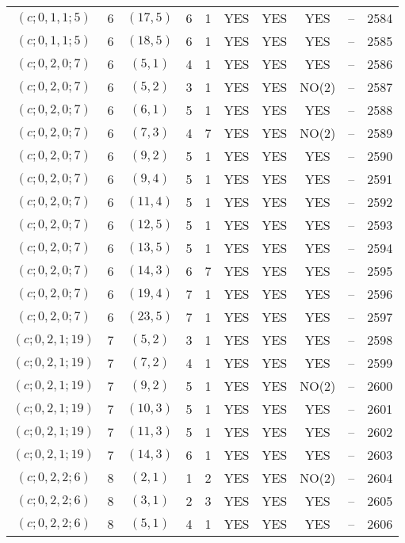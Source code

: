 \begin{longtable}{|c|c|c|c|c|c|c|c|c|c|}
$(c; 0, 1, 1; 5)$ & 6 & $(17, 5)$ & 6 & 1 & YES & YES & YES & -- & 2584\\
$(c; 0, 1, 1; 5)$ & 6 & $(18, 5)$ & 6 & 1 & YES & YES & YES & -- & 2585\\
$(c; 0, 2, 0; 7)$ & 6 & $(5, 1)$ & 4 & 1 & YES & YES & YES & -- & 2586\\
$(c; 0, 2, 0; 7)$ & 6 & $(5, 2)$ & 3 & 1 & YES & YES & NO(2) & -- & 2587\\
$(c; 0, 2, 0; 7)$ & 6 & $(6, 1)$ & 5 & 1 & YES & YES & YES & -- & 2588\\
$(c; 0, 2, 0; 7)$ & 6 & $(7, 3)$ & 4 & 7 & YES & YES & NO(2) & -- & 2589\\
$(c; 0, 2, 0; 7)$ & 6 & $(9, 2)$ & 5 & 1 & YES & YES & YES & -- & 2590\\
$(c; 0, 2, 0; 7)$ & 6 & $(9, 4)$ & 5 & 1 & YES & YES & YES & -- & 2591\\
$(c; 0, 2, 0; 7)$ & 6 & $(11, 4)$ & 5 & 1 & YES & YES & YES & -- & 2592\\
$(c; 0, 2, 0; 7)$ & 6 & $(12, 5)$ & 5 & 1 & YES & YES & YES & -- & 2593\\
$(c; 0, 2, 0; 7)$ & 6 & $(13, 5)$ & 5 & 1 & YES & YES & YES & -- & 2594\\
$(c; 0, 2, 0; 7)$ & 6 & $(14, 3)$ & 6 & 7 & YES & YES & YES & -- & 2595\\
$(c; 0, 2, 0; 7)$ & 6 & $(19, 4)$ & 7 & 1 & YES & YES & YES & -- & 2596\\
$(c; 0, 2, 0; 7)$ & 6 & $(23, 5)$ & 7 & 1 & YES & YES & YES & -- & 2597\\
$(c; 0, 2, 1; 19)$ & 7 & $(5, 2)$ & 3 & 1 & YES & YES & YES & -- & 2598\\
$(c; 0, 2, 1; 19)$ & 7 & $(7, 2)$ & 4 & 1 & YES & YES & YES & -- & 2599\\
$(c; 0, 2, 1; 19)$ & 7 & $(9, 2)$ & 5 & 1 & YES & YES & NO(2) & -- & 2600\\
$(c; 0, 2, 1; 19)$ & 7 & $(10, 3)$ & 5 & 1 & YES & YES & YES & -- & 2601\\
$(c; 0, 2, 1; 19)$ & 7 & $(11, 3)$ & 5 & 1 & YES & YES & YES & -- & 2602\\
$(c; 0, 2, 1; 19)$ & 7 & $(14, 3)$ & 6 & 1 & YES & YES & YES & -- & 2603\\
$(c; 0, 2, 2; 6)$ & 8 & $(2, 1)$ & 1 & 2 & YES & YES & NO(2) & -- & 2604\\
$(c; 0, 2, 2; 6)$ & 8 & $(3, 1)$ & 2 & 3 & YES & YES & YES & -- & 2605\\
$(c; 0, 2, 2; 6)$ & 8 & $(5, 1)$ & 4 & 1 & YES & YES & YES & -- & 2606\\

\end{longtable}
